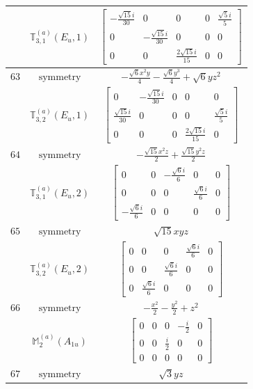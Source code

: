 \documentclass[fleqn,8pt,landscape]{jsarticle}
\begin{document}
\begin{longtable}{ccc}
$  $ & $ \mathbb{T}_{3,1}^{(a)}(E_{u},1) $ & $ \begin{bmatrix} - \frac{\sqrt{15} i}{30} & 0 & 0 & 0 & \frac{\sqrt{5} i}{5} \\ 0 & - \frac{\sqrt{15} i}{30} & 0 & 0 & 0 \\ 0 & 0 & \frac{2 \sqrt{15} i}{15} & 0 & 0 \end{bmatrix} $ \\ \hline
$ 63 $ & $ \text{symmetry} $ & $ - \frac{\sqrt{6} x^{2} y}{4} - \frac{\sqrt{6} y^{3}}{4} + \sqrt{6} y z^{2} $ \\
$  $ & $ \mathbb{T}_{3,2}^{(a)}(E_{u},1) $ & $ \begin{bmatrix} 0 & - \frac{\sqrt{15} i}{30} & 0 & 0 & 0 \\ \frac{\sqrt{15} i}{30} & 0 & 0 & 0 & \frac{\sqrt{5} i}{5} \\ 0 & 0 & 0 & \frac{2 \sqrt{15} i}{15} & 0 \end{bmatrix} $ \\ \hline
$ 64 $ & $ \text{symmetry} $ & $ - \frac{\sqrt{15} x^{2} z}{2} + \frac{\sqrt{15} y^{2} z}{2} $ \\
$  $ & $ \mathbb{T}_{3,1}^{(a)}(E_{u},2) $ & $ \begin{bmatrix} 0 & 0 & - \frac{\sqrt{6} i}{6} & 0 & 0 \\ 0 & 0 & 0 & \frac{\sqrt{6} i}{6} & 0 \\ - \frac{\sqrt{6} i}{6} & 0 & 0 & 0 & 0 \end{bmatrix} $ \\ \hline
$ 65 $ & $ \text{symmetry} $ & $ \sqrt{15} x y z $ \\
$  $ & $ \mathbb{T}_{3,2}^{(a)}(E_{u},2) $ & $ \begin{bmatrix} 0 & 0 & 0 & \frac{\sqrt{6} i}{6} & 0 \\ 0 & 0 & \frac{\sqrt{6} i}{6} & 0 & 0 \\ 0 & \frac{\sqrt{6} i}{6} & 0 & 0 & 0 \end{bmatrix} $ \\ \hline
$ 66 $ & $ \text{symmetry} $ & $ - \frac{x^{2}}{2} - \frac{y^{2}}{2} + z^{2} $ \\
$  $ & $ \mathbb{M}_{2}^{(a)}(A_{1u}) $ & $ \begin{bmatrix} 0 & 0 & 0 & - \frac{i}{2} & 0 \\ 0 & 0 & \frac{i}{2} & 0 & 0 \\ 0 & 0 & 0 & 0 & 0 \end{bmatrix} $ \\ \hline
$ 67 $ & $ \text{symmetry} $ & $ \sqrt{3} y z $ \\

\end{longtable}
\end{document}
